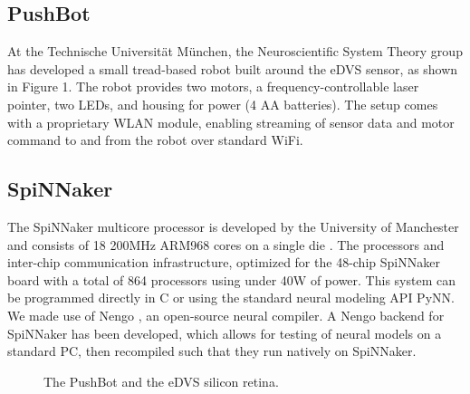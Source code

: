 \documentclass[conference]{IEEEtran}
\begin{document}
\subsection{PushBot}
At the Technische Universit{\"a}t M{\"u}nchen, the Neuroscientific
System Theory group has developed a small tread-based robot built around the eDVS sensor, as shown in Figure 1. The robot provides two motors, a frequency-controllable laser pointer, two LEDs, and housing for power (4 AA batteries). The setup comes with a proprietary WLAN module, enabling streaming of sensor data and motor command to and from the robot over standard WiFi.

\subsection{SpiNNaker}

The SpiNNaker multicore processor is developed by the University of Manchester and consists of 18 200MHz ARM968 cores on a single die \cite{furber2007neural, furber2014spinnaker}. The processors and inter-chip communication infrastructure, optimized for the 48-chip SpiNNaker board with a total of 864 processors using under 40W of power. This system can be programmed directly in C or using the standard neural modeling API PyNN. We made use of Nengo \cite{bekolay_nengo2014}, an open-source neural compiler. A Nengo backend for SpiNNaker has been developed, which allows for testing of neural models on a standard PC, then recompiled such that they run natively on SpiNNaker.


\begin{figure}[!t]
\centering
\caption{The PushBot and the eDVS silicon retina.}
\label{fig_sim}
\end{figure}
\end{document}
